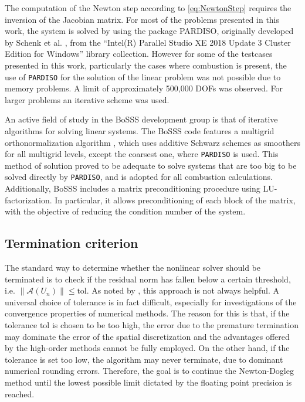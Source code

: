 The computation of the Newton step according to \cref{eq:NewtonStep} requires the inversion of the Jacobian matrix.  For most of the problems presented in this work, the system is solved by using the package \gls{PARDISO}, originally developed by Schenk et al.  \parencite{schenkEfficientSparseLU2000,schenkTwolevelDynamicScheduling2002,schenkSolvingUnsymmetricSparse2004a},
from the ``Intel(R) Parallel Studio XE 2018 Update 3 Cluster Edition for Windows'' library collection. However for some of the testcases presented in this work, particularly the cases where combustion is present, the use of \texttt{PARDISO} for the solution of the linear problem was not possible due to memory problems. A limit of approximately 500,000 DOFs was observed. For larger problems an iterative scheme was used.

An active field of study in the BoSSS development group is that of iterative algorithms for solving linear systems. The BoSSS code features a multigrid orthonormalization  algorithm \parencite{kummerBoSSSPackageMultigrid2021}, which uses additive Schwarz schemes as smoothers for all multigrid levels, except the coarsest one, where \texttt{PARDISO} is used. This method of solution proved to be adequate to solve systems that are too big to be solved directly by \texttt{PARDISO}, and is adopted for all combustion calculations.
Additionally, BoSSS includes a matrix preconditioning procedure using LU-factorization. In particular, it allows preconditioning of each block of the matrix, with the objective of reducing the condition number of the system.

\subsection{Termination criterion} \label{ssec:TerminationCriterion}
The standard way to determine whether the nonlinear solver should be terminated is to check if the residual norm has fallen below a certain threshold, i.e.
$ \| \mathcal{A}(U_n) \| \leq \textrm{tol}  $. As noted by \textcite{pawlowskiInexactNewtonDogleg2008}, this approach is not always helpful. A universal choice of tolerance is in fact difficult, especially for investigations of the convergence properties of numerical methods. 
The reason for this is that, if the tolerance $\textrm{tol}$ is chosen to be too high, the error due to the premature termination may dominate the error of the spatial discretization and the advantages offered by the high-order methods cannot be fully employed. On the other hand, if the tolerance is set too low, the algorithm may never terminate, due to dominant numerical rounding errors.  Therefore, the goal is to continue the Newton-Dogleg method until the lowest possible limit dictated by the floating point precision is reached. 

